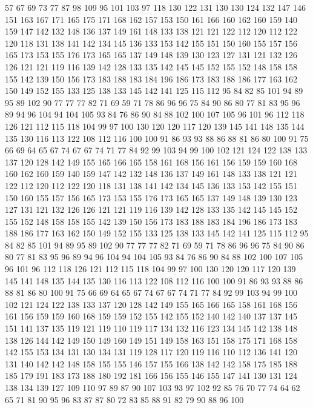 57 67 69 73 77 87 98 109 95 101 103 97 118 130 122 131 130 130 124 132
147 146 151 163 167 171 165 175 171 168 162 157 153 150 161 166 160 162 160 159
140 159 147 142 132 148 136 137 149 161 148 133 138 121 121 122 112 120 112 122
120 118 131 138 141 142 134 145 136 133 153 142 155 151 150 160 155 157 156 165
173 153 155 176 173 165 165 137 149 148 139 130 123 127 131 121 132 126 126 121
121 119 116 139 142 128 133 135 142 145 145 152 155 152 148 158 158 155 142 139
150 156 173 183 188 183 184 196 186 173 183 188 186 177 163 162 150 149 152 155
133 125 138 133 145 142 141 125 115 112 95 84 82 85 101 94 89 95 89 102
90 77 77 77 82 71 69 59 71 78 86 96 96 75 84 90 86 80 77 81
83 95 96 89 94 96 104 94 104 105 93 84 76 86 90 84 88 102 100 107
105 96 101 96 112 118 126 121 112 115 118 104 99 97 100 130 120 120 117 120
139 145 141 148 135 144 135 130 116 113 122 108 112 116 100 100 91 86 93 93
88 86 88 81 86 80 100 91 75 66 69 64 65 67 74 67 67 74 71 77
84 92 99 103 94 99 100 102 121 124 122 138 133 137 120 128 142 149 155 165
166 165 158 161 168 156 161 156 159 159 160 168 160 162 160 159 140 159 147 142
132 148 136 137 149 161 148 133 138 121 121 122 112 120 112 122 120 118 131 138
141 142 134 145 136 133 153 142 155 151 150 160 155 157 156 165 173 153 155 176
173 165 165 137 149 148 139 130 123 127 131 121 132 126 126 121 121 119 116 139
142 128 133 135 142 145 145 152 155 152 148 158 158 155 142 139 150 156 173 183
188 183 184 196 186 173 183 188 186 177 163 162 150 149 152 155 133 125 138 133
145 142 141 125 115 112 95 84 82 85 101 94 89 95 89 102 90 77 77 77
82 71 69 59 71 78 86 96 96 75 84 90 86 80 77 81 83 95 96 89
94 96 104 94 104 105 93 84 76 86 90 84 88 102 100 107 105 96 101 96
112 118 126 121 112 115 118 104 99 97 100 130 120 120 117 120 139 145 141 148
135 144 135 130 116 113 122 108 112 116 100 100 91 86 93 93 88 86 88 81
86 80 100 91 75 66 69 64 65 67 74 67 67 74 71 77 84 92 99 103
94 99 100 102 121 124 122 138 133 137 120 128 142 149 155 165 166 165 158 161
168 156 161 156 159 159 160 168 159 159 152 155 142 155 152 140 142 140 137 137
145 151 141 137 135 119 121 119 110 119 117 134 132 116 123 134 145 142 138 148
138 126 144 142 149 150 149 160 149 151 149 158 163 151 158 175 171 168 158 142
155 153 134 131 130 134 131 119 128 117 120 119 116 110 112 136 141 120 131 140
142 142 148 158 155 155 146 157 155 166 138 142 142 158 175 185 188 185 179 191
183 173 188 180 192 181 166 156 155 146 155 147 141 130 131 124 138 134 139 127
109 110 97 89 87 90 107 103 93 97 102 92 85 76 70 77 74 64 62 65
71 81 90 95 96 83 87 87 80 72 83 85 88 91 82 79 90 88 96 100
